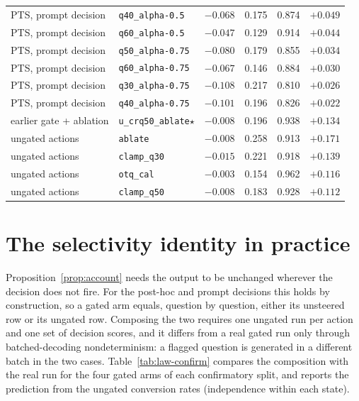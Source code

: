 {\begin{longtable}{l|l|c|cc|c}
PTS, prompt decision & \texttt{q40\_alpha-0.5} & $-0.068$ & 0.175 & 0.874 & $+0.049$ \\
PTS, prompt decision & \texttt{q60\_alpha-0.5} & $-0.047$ & 0.129 & 0.914 & $+0.044$ \\
PTS, prompt decision & \texttt{q50\_alpha-0.75} & $-0.080$ & 0.179 & 0.855 & $+0.034$ \\
PTS, prompt decision & \texttt{q60\_alpha-0.75} & $-0.067$ & 0.146 & 0.884 & $+0.030$ \\
PTS, prompt decision & \texttt{q30\_alpha-0.75} & $-0.108$ & 0.217 & 0.810 & $+0.026$ \\
PTS, prompt decision & \texttt{q40\_alpha-0.75} & $-0.101$ & 0.196 & 0.826 & $+0.022$ \\
earlier gate + ablation & \texttt{u\_crq50\_ablate}$\star$ & $-0.008$ & 0.196 & 0.938 & $+0.134$ \\
ungated actions & \texttt{ablate} & $-0.008$ & 0.258 & 0.913 & $+0.171$ \\
ungated actions & \texttt{clamp\_q30} & $-0.015$ & 0.221 & 0.918 & $+0.139$ \\
ungated actions & \texttt{otq\_cal} & $-0.003$ & 0.154 & 0.962 & $+0.116$ \\
ungated actions & \texttt{clamp\_q50} & $-0.008$ & 0.183 & 0.928 & $+0.112$ \\
\hline
\end{longtable}}

\section{The selectivity identity in practice}
\label{app:law}

Proposition~\ref{prop:account} needs the output to be unchanged wherever the
decision does not fire. For the post-hoc and prompt decisions this holds by
construction, so a gated arm equals, question by question, either its unsteered
row or its ungated row. Composing the two requires one ungated run per action
and one set of decision scores, and it differs from a real gated run only
through batched-decoding nondeterminism: a flagged question is generated in a
different batch in the two cases. Table~\ref{tab:law-confirm} compares the
composition with the real run for the four gated arms of each confirmatory
split, and reports the prediction from the ungated conversion rates
(independence within each state).

